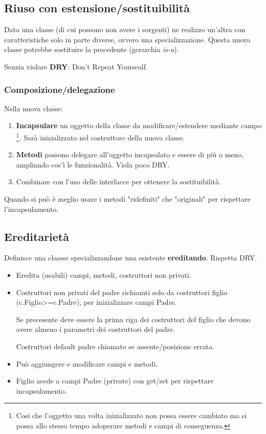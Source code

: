 \subsection{Riuso con estensione/sostituibilità}
Data una classe (di cui possono non avere i sorgenti) ne realizzo un'altra con caratteristiche solo in parte diverse, ovvero una specializzazione. Questa nuova classe potrebbe sostituire la precedente (gerarchia \textit{is-a}).

Senzia violare \textbf{DRY}: Don't Repeat Yoursealf.

\subsubsection{Composizione/delegazione}
Nella nuova classe:
\begin{enumerate}
	\item \textbf{Incapsulare} un oggetto della classe da modificare/estendere mediante campo \footnote{Cosi che l'oggetto una volta inizializzato non possa essere cambiato ma si possa allo stesso tempo adoperare metodi e campi di conseguenza.}. Sarà inizializzato nel costruttore della nuova classe.

	\item \textbf{Metodi} possono delegare all'oggetto incapsulato e essere di più o meno, ampliando cos'ì le funzionalità. Viola poco DRY.

	\item Combinare con l'uso delle interfacce per ottenere la sostituibilità.
\end{enumerate}
Quando si può è meglio usare i metodi "ridefiniti" che "originali" per rispettare l'incapsulamento.

\subsection{Ereditarietà}
Definisce una classse specializzandone una esistente \textbf{ereditando}. Rispetta DRY.


\begin{itemize}
	\item Eredita (usabili) campi, metodi, costruttori non privati.

	\item Costruttori non privati del padre richiamti solo da costruttori figlio (c.Figlio>=c.Padre), per inizializzare campi Padre.


	Se precesente deve essere la prima riga dei costruttori del figlio che devono avere almeno i parametri dei costruttori del padre.

	Costruttori default padre chiamato se  assente/posizione errata.
	\item Può aggiungere e modificare campi e metodi.

	\item Figlio acede a campi Padre (private) con get/set  per rispettare incapsulamento.
\end{itemize}

